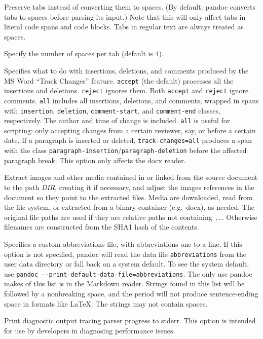 \documentclass[
  b5paper
]{book}
\begin{document}
\begin{description}
Preserve tabs instead of converting them to spaces. (By default, pandoc
converts tabs to spaces before parsing its input.) Note that this will
only affect tabs in literal code spans and code blocks. Tabs in regular
text are always treated as spaces.
\item[\texttt{-\/-tab-stop=}\emph{NUMBER}]
Specify the number of spaces per tab (default is 4).
\item[\texttt{-\/-track-changes=accept}\textbar{}\texttt{reject}\textbar{}\texttt{all}]
Specifies what to do with insertions, deletions, and comments produced
by the MS Word ``Track Changes'' feature. \texttt{accept} (the default)
processes all the insertions and deletions. \texttt{reject} ignores
them. Both \texttt{accept} and \texttt{reject} ignore comments.
\texttt{all} includes all insertions, deletions, and comments, wrapped
in spans with \texttt{insertion}, \texttt{deletion},
\texttt{comment-start}, and \texttt{comment-end} classes, respectively.
The author and time of change is included. \texttt{all} is useful for
scripting: only accepting changes from a certain reviewer, say, or
before a certain date. If a paragraph is inserted or deleted,
\texttt{track-changes=all} produces a span with the class
\texttt{paragraph-insertion}/\texttt{paragraph-deletion} before the
affected paragraph break. This option only affects the docx reader.
\item[\texttt{-\/-extract-media=}\emph{DIR}]
Extract images and other media contained in or linked from the source
document to the path \emph{DIR}, creating it if necessary, and adjust
the images references in the document so they point to the extracted
files. Media are downloaded, read from the file system, or extracted
from a binary container (e.g.~docx), as needed. The original file paths
are used if they are relative paths not containing \texttt{..}.
Otherwise filenames are constructed from the SHA1 hash of the contents.
\item[\texttt{-\/-abbreviations=}\emph{FILE}]
Specifies a custom abbreviations file, with abbreviations one to a line.
If this option is not specified, pandoc will read the data file
\texttt{abbreviations} from the user data directory or fall back on a
system default. To see the system default, use
\texttt{pandoc\ -\/-print-default-data-file=abbreviations}. The only use
pandoc makes of this list is in the Markdown reader. Strings found in
this list will be followed by a nonbreaking space, and the period will
not produce sentence-ending space in formats like LaTeX. The strings may
not contain spaces.
\item[\texttt{-\/-trace{[}=true\textbar{}false{]}}]
Print diagnostic output tracing parser progress to stderr. This option
is intended for use by developers in diagnosing performance issues.
\end{description}
\end{document}
